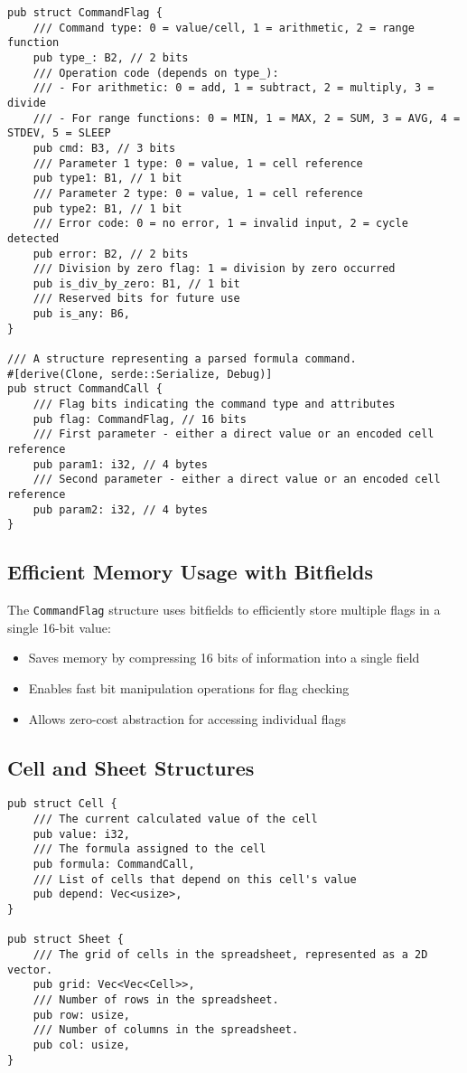 \documentclass[12pt]{article}
\begin{document}
\begin{lstlisting}[caption={Core data structures for formulas}]
pub struct CommandFlag {
    /// Command type: 0 = value/cell, 1 = arithmetic, 2 = range function
    pub type_: B2, // 2 bits
    /// Operation code (depends on type_):
    /// - For arithmetic: 0 = add, 1 = subtract, 2 = multiply, 3 = divide
    /// - For range functions: 0 = MIN, 1 = MAX, 2 = SUM, 3 = AVG, 4 = STDEV, 5 = SLEEP
    pub cmd: B3, // 3 bits
    /// Parameter 1 type: 0 = value, 1 = cell reference
    pub type1: B1, // 1 bit
    /// Parameter 2 type: 0 = value, 1 = cell reference
    pub type2: B1, // 1 bit
    /// Error code: 0 = no error, 1 = invalid input, 2 = cycle detected
    pub error: B2, // 2 bits
    /// Division by zero flag: 1 = division by zero occurred
    pub is_div_by_zero: B1, // 1 bit
    /// Reserved bits for future use
    pub is_any: B6,
}

/// A structure representing a parsed formula command.
#[derive(Clone, serde::Serialize, Debug)]
pub struct CommandCall {
    /// Flag bits indicating the command type and attributes
    pub flag: CommandFlag, // 16 bits
    /// First parameter - either a direct value or an encoded cell reference
    pub param1: i32, // 4 bytes
    /// Second parameter - either a direct value or an encoded cell reference
    pub param2: i32, // 4 bytes
}
\end{lstlisting}

\subsection{Efficient Memory Usage with Bitfields}
The \texttt{CommandFlag} structure uses bitfields to efficiently store multiple flags in a single 16-bit value:
\begin{itemize}
    \item Saves memory by compressing 16 bits of information into a single field
    \item Enables fast bit manipulation operations for flag checking
    \item Allows zero-cost abstraction for accessing individual flags
\end{itemize}

\subsection{Cell and Sheet Structures}

\begin{lstlisting}[caption={Cell and Sheet structures}]
pub struct Cell {
    /// The current calculated value of the cell
    pub value: i32,
    /// The formula assigned to the cell
    pub formula: CommandCall,
    /// List of cells that depend on this cell's value
    pub depend: Vec<usize>,
}

pub struct Sheet {
    /// The grid of cells in the spreadsheet, represented as a 2D vector.
    pub grid: Vec<Vec<Cell>>,
    /// Number of rows in the spreadsheet.
    pub row: usize,
    /// Number of columns in the spreadsheet.
    pub col: usize,
}
\end{lstlisting}
\end{document}
